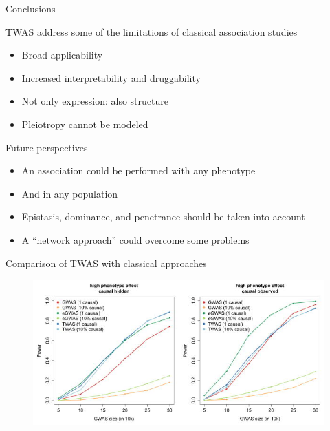 \documentclass[aspectratio=169,12pt]{beamer}
\begin{document}
\begin{frame}{Conclusions}

	TWAS address some of the limitations of classical association 
studies

	\begin{itemize}
		\item Broad applicability
		\item Increased interpretability and druggability
		\item Not only expression: also structure
	\end{itemize}

	\begin{itemize}
		\item Pleiotropy cannot be modeled
	\end{itemize}

\end{frame}

\begin{frame}{Future perspectives}

	\begin{itemize}
		\item<1-> An association could be performed with any phenotype
		\item<2-> And in any population
		\item<3-> Epistasis, dominance, and penetrance should be taken 
into account
		\item<4-> A \enquote{network approach} could overcome some 
problems
	\end{itemize}

\end{frame}

\appendix


\begin{frame}[plain] %
	\nocite{*}
	\tiny
	\printbibliography[title=References,keyword=TWAS]
\end{frame}

\begin{frame}{Comparison of TWAS with classical approaches}

	\begin{figure}
		\includegraphics{gusev2016/5-association_power}
	\end{figure}


\end{frame}
\end{document}
